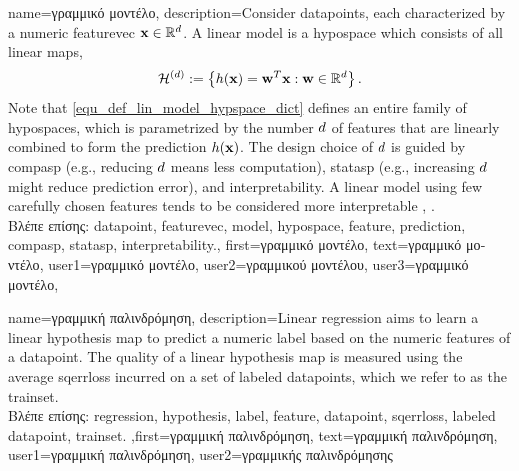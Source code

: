 {name={\foreignlanguage{greek}{γραμμικό μοντέλο}},
	description={Consider \gls{datapoint}s, each characterized by a numeric \gls{featurevec} 
		${\bf x} \in \mathbb{R}^{d}$. A linear \gls{model} is 
		a \gls{hypospace} which consists of all linear maps, 
	\begin{equation} 
		\label{equ_def_lin_model_hypspace_dict}
		\mathcal{H}^{(d)} := \left\{ h({\bf x})= {\bf w}^{T} {\bf x}: {\bf w} \in \mathbb{R}^{d} \right\}. 
	\end{equation} 
	Note that \eqref{equ_def_lin_model_hypspace_dict} defines an entire family of \gls{hypospace}s, which is 
	parametrized by the number $d$ of \gls{feature}s that are linearly combined to form the 
	\gls{prediction} $h({\bf x})$. The design choice of $d$ is guided by \gls{compasp} 
	(e.g., reducing $d$ means less computation), \gls{statasp} (e.g., increasing $d$ might 
	reduce \gls{prediction} error), and \gls{interpretability}. A linear \gls{model} using few carefully chosen 
	\gls{feature}s tends to be considered more interpretable \cite{rudin2019stop}, \cite{Ribeiro2016}.\\
	\foreignlanguage{greek}{Βλέπε επίσης:} \gls{datapoint}, \gls{featurevec}, \gls{model}, \gls{hypospace}, \gls{feature}, \gls{prediction}, \gls{compasp}, \gls{statasp}, \gls{interpretability}.}, 
   first={\foreignlanguage{greek}{γραμμικό μοντέλο}},
   text={\foreignlanguage{greek}{γραμμικό μοντέλο}},
   user1={\foreignlanguage{greek}{γραμμικό μοντέλο}}, %
   user2={\foreignlanguage{greek}{γραμμικού μοντέλου}}, %
   user3={\foreignlanguage{greek}{γραμμικό μοντέλο}}, %
}

{name={\foreignlanguage{greek}{γραμμική παλινδρόμηση}}, 
	description={Linear 
		\gls{regression} aims to learn a linear \gls{hypothesis} map to predict a numeric \gls{label} based 
		on the numeric \gls{feature}s of a \gls{datapoint}. The quality of a linear \gls{hypothesis} map is 
		measured using the average \gls{sqerrloss} incurred on a set of \gls{labeled datapoint}s, 
		which we refer to as the \gls{trainset}.\\
		\foreignlanguage{greek}{Βλέπε επίσης:} \gls{regression}, \gls{hypothesis}, \gls{label}, \gls{feature}, \gls{datapoint},  \gls{sqerrloss}, \gls{labeled datapoint}, \gls{trainset}.
		},first={\foreignlanguage{greek}{γραμμική παλινδρόμηση}},
		text={\foreignlanguage{greek}{γραμμική παλινδρόμηση}},
		user1={\foreignlanguage{greek}{γραμμική παλινδρόμηση}}, %
		user2={\foreignlanguage{greek}{γραμμικής παλινδρόμησης}} %
}

